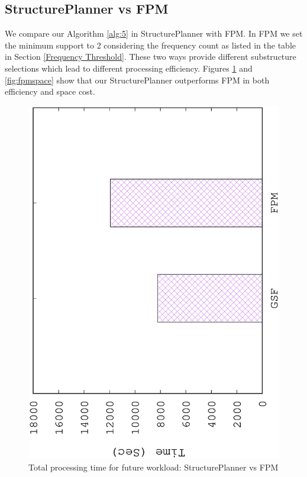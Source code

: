 \subsection{StructurePlanner vs FPM}
\label{StructurePlanner vs FPM}
We compare our Algorithm \ref{alg:5} in StructurePlanner with FPM. In FPM we set the minimum support to 2 considering the frequency count as listed in the table in Section \ref{Frequency Threshold}. These two ways provide different substructure selections which lead to different processing efficiency. Figures \ref{fig:fpmtotal} and \ref{fig:fpmspace} show that our StructurePlanner outperforms FPM in both efficiency and space cost.

\begin{figure}[H]
	\centering
	\includegraphics[scale=0.47, angle=270]{plot/fpm.eps}
	\caption{Total processing time for future workload: StructurePlanner vs FPM}
	\label{fig:fpmtotal}
\end{figure}


